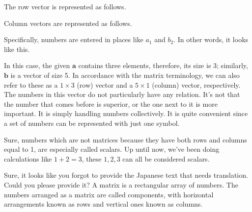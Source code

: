 \documentclass{ltjsbook}
\begin{document}
The row vector is represented as follows.


Column vectors are represented as follows.


Specifically, numbers are entered in places like $a_1$ and $b_2$. In other words, it looks like this.


In this case, the given $\bm{a}$ contains three elements, therefore, its size is 3; similarly, $\bm{b}$ is a vector of size 5. In accordance with the matrix terminology, we can also refer to these as a $1 \times 3$ (row) vector and a $5 \times 1$ (column) vector, respectively.
The numbers in this vector do not particularly have any relation. It's not that the number that comes before is superior, or the one next to it is more important. It is simply handling numbers collectively. It is quite convenient since a set of numbers can be represented with just one symbol.

Sure, numbers which are not matrices because they have both rows and columns equal to 1, are especially called scalars. Up until now, we've been doing calculations like $1+2=3$, these $1, 2, 3$ can all be considered scalars.

Sure, it looks like you forgot to provide the Japanese text that needs translation. Could you please provide it?
A matrix is a rectangular array of numbers. The numbers arranged as a matrix are called components, with horizontal arrangements known as rows and vertical ones known as columns.
\end{document}
